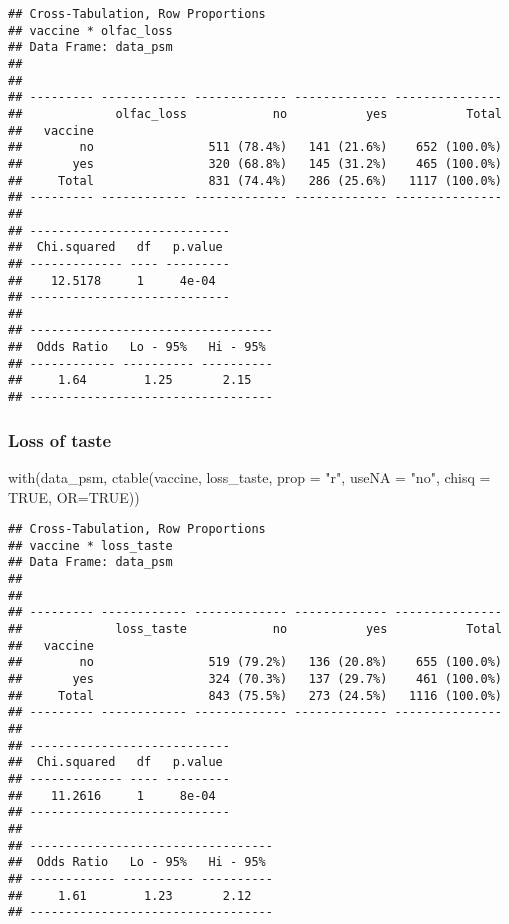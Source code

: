 \documentclass[
]{article}
\newenvironment{Shaded}{\begin{snugshade}}{\end{snugshade}}
\newcommand{\AttributeTok}[1]{\textcolor[rgb]{0.77,0.63,0.00}{#1}}
\newcommand{\ConstantTok}[1]{\textcolor[rgb]{0.00,0.00,0.00}{#1}}
\newcommand{\FunctionTok}[1]{\textcolor[rgb]{0.00,0.00,0.00}{#1}}
\newcommand{\NormalTok}[1]{#1}
\newcommand{\StringTok}[1]{\textcolor[rgb]{0.31,0.60,0.02}{#1}}
\begin{document}
\begin{verbatim}
## Cross-Tabulation, Row Proportions  
## vaccine * olfac_loss  
## Data Frame: data_psm  
## 
## 
## --------- ------------ ------------- ------------- ---------------
##             olfac_loss            no           yes           Total
##   vaccine                                                         
##        no                511 (78.4%)   141 (21.6%)    652 (100.0%)
##       yes                320 (68.8%)   145 (31.2%)    465 (100.0%)
##     Total                831 (74.4%)   286 (25.6%)   1117 (100.0%)
## --------- ------------ ------------- ------------- ---------------
## 
## ----------------------------
##  Chi.squared   df   p.value 
## ------------- ---- ---------
##    12.5178     1     4e-04  
## ----------------------------
## 
## ----------------------------------
##  Odds Ratio   Lo - 95%   Hi - 95% 
## ------------ ---------- ----------
##     1.64        1.25       2.15   
## ----------------------------------
\end{verbatim}

\hypertarget{loss-of-taste-1}{%
\subsubsection{Loss of taste}\label{loss-of-taste-1}}

\begin{Shaded}
\begin{Highlighting}[]
\FunctionTok{with}\NormalTok{(data\_psm, }\FunctionTok{ctable}\NormalTok{(vaccine, loss\_taste, }\AttributeTok{prop =} \StringTok{"r"}\NormalTok{, }\AttributeTok{useNA =} \StringTok{"no"}\NormalTok{, }\AttributeTok{chisq =} \ConstantTok{TRUE}\NormalTok{, }\AttributeTok{OR=}\ConstantTok{TRUE}\NormalTok{))}
\end{Highlighting}
\end{Shaded}

\begin{verbatim}
## Cross-Tabulation, Row Proportions  
## vaccine * loss_taste  
## Data Frame: data_psm  
## 
## 
## --------- ------------ ------------- ------------- ---------------
##             loss_taste            no           yes           Total
##   vaccine                                                         
##        no                519 (79.2%)   136 (20.8%)    655 (100.0%)
##       yes                324 (70.3%)   137 (29.7%)    461 (100.0%)
##     Total                843 (75.5%)   273 (24.5%)   1116 (100.0%)
## --------- ------------ ------------- ------------- ---------------
## 
## ----------------------------
##  Chi.squared   df   p.value 
## ------------- ---- ---------
##    11.2616     1     8e-04  
## ----------------------------
## 
## ----------------------------------
##  Odds Ratio   Lo - 95%   Hi - 95% 
## ------------ ---------- ----------
##     1.61        1.23       2.12   
## ----------------------------------
\end{verbatim}
\end{document}

